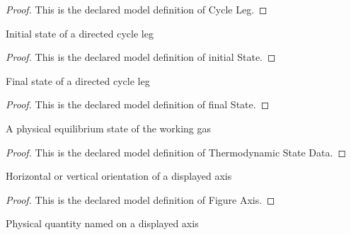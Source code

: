 \begin{proof}
  This is the declared model definition of Cycle Leg.
\end{proof}
\begin{definition}
  \label{def:physics:phyx-mini-0426:phyxminiproblems-problemphyxmini0426-cycleleg-initialstate}
  Initial state of a directed cycle leg
\end{definition}
\begin{proof}
  This is the declared model definition of initial State.
\end{proof}
\begin{definition}
  \label{def:physics:phyx-mini-0426:phyxminiproblems-problemphyxmini0426-cycleleg-finalstate}
  Final state of a directed cycle leg
\end{definition}
\begin{proof}
  This is the declared model definition of final State.
\end{proof}
\begin{definition}
  \label{def:physics:phyx-mini-0426:phyxminiproblems-problemphyxmini0426-thermodynamicstatedata}
  A physical equilibrium state of the working gas
\end{definition}
\begin{proof}
  This is the declared model definition of Thermodynamic State Data.
\end{proof}
\begin{definition}
  \label{def:physics:phyx-mini-0426:phyxminiproblems-problemphyxmini0426-figureaxis}
  Horizontal or vertical orientation of a displayed axis
\end{definition}
\begin{proof}
  This is the declared model definition of Figure Axis.
\end{proof}
\begin{definition}
  \label{def:physics:phyx-mini-0426:phyxminiproblems-problemphyxmini0426-figureaxisquantity}
  Physical quantity named on a displayed axis
\end{definition}
